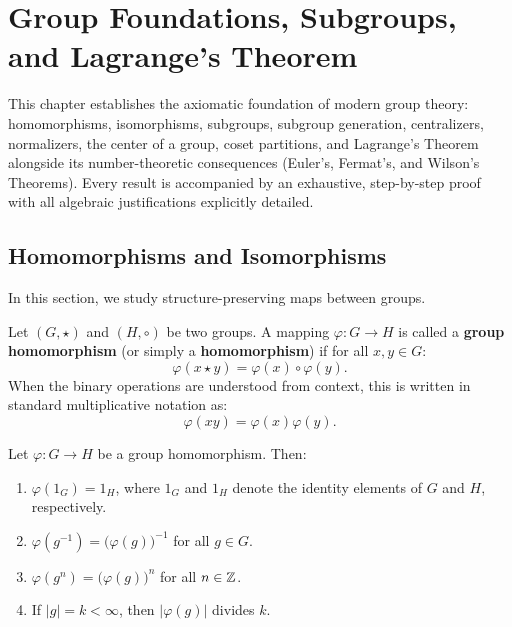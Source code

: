 \chapter{Group Foundations, Subgroups, and Lagrange's Theorem}
\label{chap:unit1}

This chapter establishes the axiomatic foundation of modern group theory: homomorphisms, isomorphisms, subgroups, subgroup generation, centralizers, normalizers, the center of a group, coset partitions, and Lagrange's Theorem alongside its number-theoretic consequences (Euler's, Fermat's, and Wilson's Theorems). Every result is accompanied by an exhaustive, step-by-step proof with all algebraic justifications explicitly detailed.

\section{Homomorphisms and Isomorphisms}
\label{sec:homomorphisms}

In this section, we study structure-preserving maps between groups.

\begin{definition}
Let $(G, \star)$ and $(H, \circ)$ be two groups. A mapping $\varphi: G \to H$ is called a \textbf{group homomorphism} (or simply a \textbf{homomorphism}) if for all $x, y \in G$:
\begin{equation}
\varphi(x \star y) = \varphi(x) \circ \varphi(y).
\end{equation}
When the binary operations are understood from context, this is written in standard multiplicative notation as:
\begin{equation}
\varphi(xy) = \varphi(x)\varphi(y).
\end{equation}
\end{definition}

\begin{proposition}
\label{prop:hom_props}
Let $\varphi: G \to H$ be a group homomorphism. Then:
\begin{enumerate}[label=\textbf{(\roman*)}, leftmargin=*, itemsep=4pt]
    \item $\varphi(1_G) = 1_H$, where $1_G$ and $1_H$ denote the identity elements of $G$ and $H$, respectively.
    \item $\varphi(g^{-1}) = \bigl(\varphi(g)\bigr)^{-1}$ for all $g \in G$.
    \item $\varphi(g^n) = \bigl(\varphi(g)\bigr)^n$ for all $n \in \mathbb{Z}$.
    \item If $|g| = k < \infty$, then $|\varphi(g)|$ divides $k$.
\end{enumerate}
\end{proposition}

